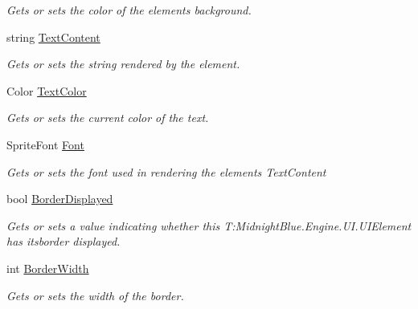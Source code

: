\begin{DoxyCompactItemize}
\begin{DoxyCompactList}\small\item\em Gets or sets the color of the elements background. \end{DoxyCompactList}\item 
string \hyperlink{class_midnight_blue_1_1_engine_1_1_u_i_1_1_u_i_element_a49bc3d1da069a0da5c39218c9538d64f}{Text\+Content}
\begin{DoxyCompactList}\small\item\em Gets or sets the string rendered by the element. \end{DoxyCompactList}\item 
Color \hyperlink{class_midnight_blue_1_1_engine_1_1_u_i_1_1_u_i_element_ad8a234b2f0042ba37f73d805f7ab2746}{Text\+Color}
\begin{DoxyCompactList}\small\item\em Gets or sets the current color of the text. \end{DoxyCompactList}\item 
Sprite\+Font \hyperlink{class_midnight_blue_1_1_engine_1_1_u_i_1_1_u_i_element_a71ad458953ae5fb4655051cda7a809f7}{Font}
\begin{DoxyCompactList}\small\item\em Gets or sets the font used in rendering the elements Text\+Content \end{DoxyCompactList}\item 
bool \hyperlink{class_midnight_blue_1_1_engine_1_1_u_i_1_1_u_i_element_a8631ee4e0cc1d664fdc086364a296ad2}{Border\+Displayed}
\begin{DoxyCompactList}\small\item\em Gets or sets a value indicating whether this T\+:\+Midnight\+Blue.\+Engine.\+U\+I.\+U\+I\+Element has itsborder displayed. \end{DoxyCompactList}\item 
int \hyperlink{class_midnight_blue_1_1_engine_1_1_u_i_1_1_u_i_element_ab3b26497b32ce0c7f474898e7bd1ea8e}{Border\+Width}
\begin{DoxyCompactList}\small\item\em Gets or sets the width of the border. \end{DoxyCompactList}\item 

\end{DoxyCompactItemize}
